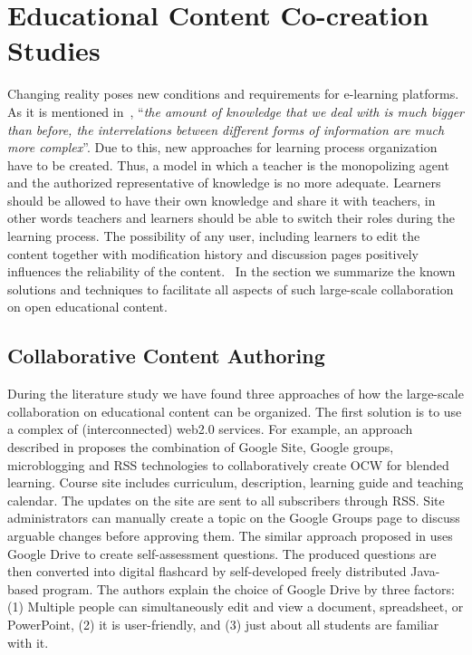 \documentclass[ngerman,UKenglish,table]{scrbook}
\begin{document}
\section{Educational Content Co-creation Studies}
Changing reality poses new conditions and requirements for e-learning platforms.
As it is mentioned in~\cite{DBLP:reference/ai/PedreiraSC09}, ``\emph{the amount of knowledge that we deal with is much bigger than before, the interrelations between different forms of information are much more complex}''.
Due to this, new approaches for learning process organization have to be created.
Thus, a model in which a teacher is the monopolizing agent and the authorized representative of knowledge is no more adequate.
Learners should be allowed to have their own knowledge and share it with teachers, in other words teachers and learners should be able to switch their roles during the learning process.
The possibility of any user, including learners to edit the content together with modification history and discussion pages positively influences the reliability of the content.~\cite{Jiake2010}
In the section we summarize the known solutions and techniques to facilitate all aspects of such large-scale collaboration on open educational content.

\subsection{Collaborative Content Authoring}

During the literature study we have found three approaches of how the large-scale collaboration on educational content can be organized.
The first solution is to use a complex of (interconnected) web2.0 services.
For example, an approach described in \cite{Cai2010} proposes the combination of Google Site, Google groups, microblogging and RSS technologies to collaboratively create OCW for blended learning.
Course site includes curriculum, description, learning guide and teaching calendar.
The updates on the site are sent to all subscribers through RSS.
Site administrators can manually create a topic on the Google Groups page to discuss arguable changes before approving them.
The similar approach proposed in \cite{Bow2013} uses Google Drive to create self-assessment questions.
The produced questions are then converted into digital flashcard by self-developed freely distributed Java-based program.
The authors explain the choice of Google Drive by three factors: (1) Multiple people can simultaneously edit and view a document, spreadsheet, or PowerPoint, (2) it is user-friendly, and (3) just about all students are familiar with it.
\end{document}
